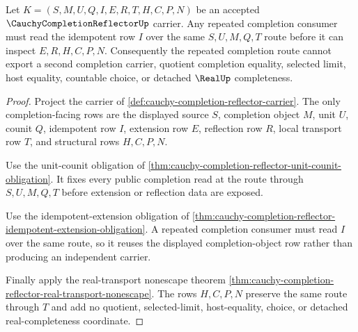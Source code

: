 \begin{theorem}
\label{thm:cauchy-completion-reflector-idempotent-nonescape}
Let $K=(S,M,U,Q,I,E,R,T,H,C,P,N)$ be an accepted $\CauchyCompletionReflectorUp$ carrier. Any repeated completion consumer must read the idempotent row $I$ over the same $S,U,M,Q,T$ route before it can inspect $E,R,H,C,P,N$. Consequently the repeated completion route cannot export a second completion carrier, quotient completion equality, selected limit, host equality, countable choice, or detached $\RealUp$ completeness.
\end{theorem}
\begin{proof}
Project the carrier of \autoref{def:cauchy-completion-reflector-carrier}. The only completion-facing rows are the displayed source $S$, completion object $M$, unit $U$, counit $Q$, idempotent row $I$, extension row $E$, reflection row $R$, local transport row $T$, and structural rows $H,C,P,N$.

Use the unit-counit obligation of \autoref{thm:cauchy-completion-reflector-unit-counit-obligation}. It fixes every public completion read at the route through $S,U,M,Q,T$ before extension or reflection data are exposed.

Use the idempotent-extension obligation of \autoref{thm:cauchy-completion-reflector-idempotent-extension-obligation}. A repeated completion consumer must read $I$ over the same route, so it reuses the displayed completion-object row rather than producing an independent carrier.

Finally apply the real-transport nonescape theorem \autoref{thm:cauchy-completion-reflector-real-transport-nonescape}. The rows $H,C,P,N$ preserve the same route through $T$ and add no quotient, selected-limit, host-equality, choice, or detached real-completeness coordinate.
\end{proof}

